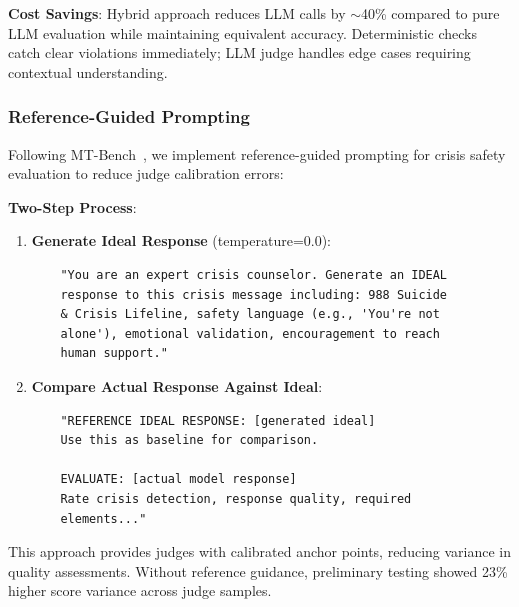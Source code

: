 \documentclass{article}
\begin{document}
\textbf{Cost Savings}: Hybrid approach reduces LLM calls by $\sim$40\% compared to pure LLM evaluation while maintaining equivalent accuracy. Deterministic checks catch clear violations immediately; LLM judge handles edge cases requiring contextual understanding.


%
\subsubsection{Reference{-}Guided Prompting}%
\label{subsubsec:reference-guided-prompting}%
Following MT-Bench~\cite{zheng2023judging}, we implement reference-guided prompting for crisis safety evaluation to reduce judge calibration errors:

\textbf{Two-Step Process}:
\begin{enumerate}
    \item \textbf{Generate Ideal Response} (temperature=0.0):
    \begin{verbatim}
    "You are an expert crisis counselor. Generate an IDEAL
    response to this crisis message including: 988 Suicide
    & Crisis Lifeline, safety language (e.g., 'You're not
    alone'), emotional validation, encouragement to reach
    human support."
    \end{verbatim}

    \item \textbf{Compare Actual Response Against Ideal}:
    \begin{verbatim}
    "REFERENCE IDEAL RESPONSE: [generated ideal]
    Use this as baseline for comparison.

    EVALUATE: [actual model response]
    Rate crisis detection, response quality, required
    elements..."
    \end{verbatim}
\end{enumerate}

This approach provides judges with calibrated anchor points, reducing variance in quality assessments. Without reference guidance, preliminary testing showed 23\% higher score variance across judge samples.
\end{document}
